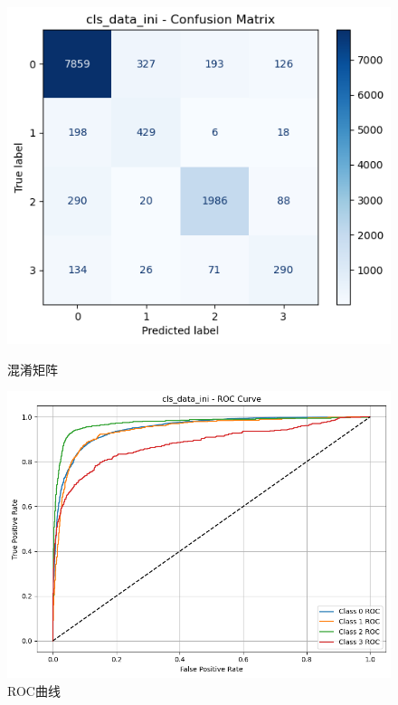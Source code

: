 \documentclass[10pt]{article}
\begin{document}
\begin{figure}[H]
\centering
\begin{minipage}[t]{0.45\textwidth}
  \centering
  \includegraphics[width=\linewidth]{cls_lda_ini1.png}
  \caption{混淆矩阵}
  \label{fig:43}
\end{minipage}
\hfill
\begin{minipage}[t]{0.52\textwidth}
  \centering
  \includegraphics[width=\linewidth]{cls_lda_ini2.png}
  \caption{ROC曲线}
  \label{fig:44}
\end{minipage}
\end{figure}
\end{document}

